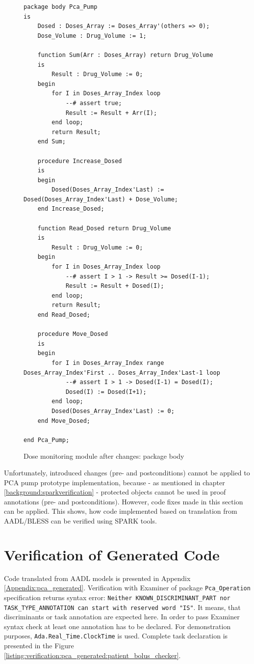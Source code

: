 \begin{figure}
\singlespacing
\begin{lstlisting}[frame=single, gobble=0]
package body Pca_Pump
is
    Dosed : Doses_Array := Doses_Array'(others => 0);
    Dose_Volume : Drug_Volume := 1;

    function Sum(Arr : Doses_Array) return Drug_Volume
    is
        Result : Drug_Volume := 0;
    begin
        for I in Doses_Array_Index loop
            --# assert true;
            Result := Result + Arr(I);
        end loop;
        return Result;
    end Sum;

    procedure Increase_Dosed
    is
    begin
        Dosed(Doses_Array_Index'Last) := Dosed(Doses_Array_Index'Last) + Dose_Volume;
    end Increase_Dosed;

    function Read_Dosed return Drug_Volume
    is
        Result : Drug_Volume := 0;
    begin
        for I in Doses_Array_Index loop
            --# assert I > 1 -> Result >= Dosed(I-1);
            Result := Result + Dosed(I);
        end loop;
        return Result;
    end Read_Dosed;

    procedure Move_Dosed
    is
    begin
        for I in Doses_Array_Index range Doses_Array_Index'First .. Doses_Array_Index'Last-1 loop
            --# assert I > 1 -> Dosed(I-1) = Dosed(I);
            Dosed(I) := Dosed(I+1);
        end loop;
        Dosed(Doses_Array_Index'Last) := 0;
    end Move_Dosed;

end Pca_Pump;
\end{lstlisting}
\doublespacing
\caption{Dose monitoring module after changes: package body}
\label{listing:pcapump_dosemonitor:spark2005_body}
\end{figure}

Unfortunately, introduced changes (pre- and postconditions) cannot be applied to PCA pump prototype implementation, because - as mentioned in chapter \ref{background:sparkverification} - protected objects cannot be used in proof annotations (pre- and postconditions). However, code fixes made in this section can be applied. This shows, how code implemented based on translation from AADL/BLESS can be verified using SPARK tools.



\section{Verification of Generated Code}
\label{verification:generated}

Code translated from AADL models is presented in Appendix \ref{Appendix:pca_generated}. Verification with Examiner of package \lstinline{Pca_Operation} specification returns syntax error: \lstinline{Neither KNOWN_DISCRIMINANT_PART nor TASK_TYPE_ANNOTATION can start with reserved word "IS"}. It means, that discriminants or task annotation are expected here. In order to pass Examiner syntax check at least one annotation has to be declared. For demonstration purposes, \lstinline{Ada.Real_Time.ClockTime} is used. Complete task declaration is presented in the Figure \ref{listing:verification:pca_generated:patient_bolus_checker}.

